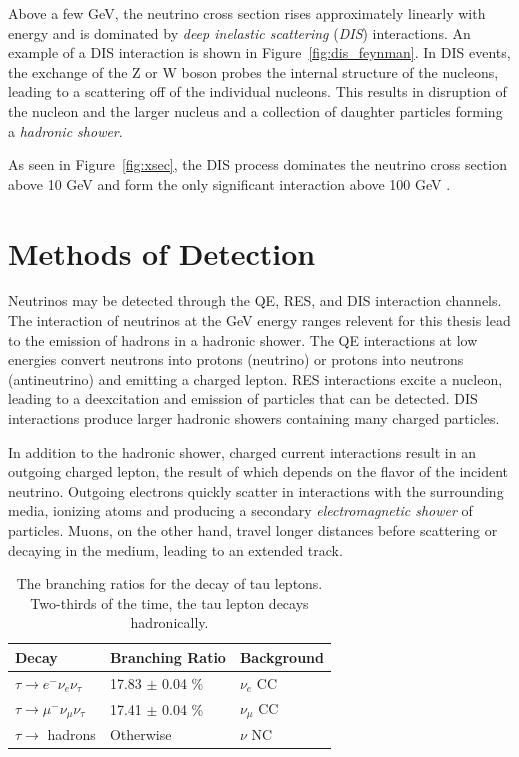Above a few GeV, the neutrino cross section rises approximately linearly with energy and is dominated by \emph{deep inelastic scattering} (\emph{DIS}) interactions.
An example of a DIS interaction is shown in Figure~\ref{fig:dis_feynman}.
In DIS events, the exchange of the Z or W boson probes the internal structure of the nucleons, leading to a scattering off of the individual nucleons.
This results in disruption of the nucleon and the larger nucleus and a collection of daughter particles forming a \emph{hadronic shower}.

As seen in Figure~\ref{fig:xsec}, the DIS process dominates the neutrino cross section above 10 GeV and form the only significant interaction above 100 GeV \cite{Formaggio-Xsec}. 

\section{Methods of Detection}
\label{sec:detection_methods}
Neutrinos may be detected through the QE, RES, and DIS interaction channels.
The interaction of neutrinos at the GeV energy ranges relevent for this thesis lead to the emission of hadrons in a hadronic shower.
The QE interactions at low energies convert neutrons into protons (neutrino) or protons into neutrons (antineutrino) and emitting a charged lepton.
RES interactions excite a nucleon, leading to a deexcitation and emission of particles that can be detected.
DIS interactions produce larger hadronic showers containing many charged particles.

In addition to the hadronic shower, charged current interactions result in an outgoing charged lepton, the result of which depends on the flavor of the incident neutrino.
Outgoing electrons quickly scatter in interactions with the surrounding media, ionizing atoms and producing a secondary \emph{electromagnetic shower} of particles.
Muons, on the other hand, travel longer distances before scattering or decaying in the medium, leading to an extended track.

\begin{table}[]
\centering
\begin{tabular}{@{}lll@{}}
\toprule
Decay                                     & Branching Ratio     & Background   \\ \midrule
$\tau \rightarrow e^- \nu_e \nu_\tau$     & 17.83 $\pm$ 0.04 \% & $\nu_e$ CC   \\
$\tau \rightarrow \mu^- \nu_\mu \nu_\tau$ & 17.41 $\pm$ 0.04 \% & $\nu_\mu$ CC \\
$\tau \rightarrow$ hadrons                & Otherwise           & $\nu$ NC     \\ \bottomrule
\end{tabular}
\caption[Branching ratios for the tau lepton decay]{The branching ratios for the decay of tau leptons. Two-thirds of the time, the tau lepton decays hadronically.}
\label{tab:tau_decays}
\end{table}

